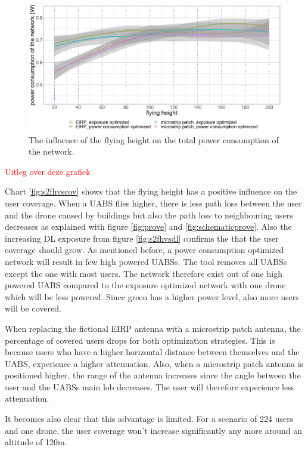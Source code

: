 \begin{figure}[h!]
  \includegraphics[width=\textwidth]{../results/s2/fhvspc.png}
  \caption{The influence of the flying height on the total power consumption of the network.}
  \label{fig:s2fhvspc}
\end{figure}
\textcolor{red}{Uitleg over deze grafiek}

Chart  \ref{fig:s2fhvscov} shows that the flying height has a positive influence on the user coverage. 
When a \gls{UABS} flies higher, there is less path loss between the user and the drone caused by buildings but also the path loss to neighbouring 
users decreases as explained 
with figure \ref{fig:prove} and \ref{fig:schematicprove}. 
Also the increasing \gls{DL} exposure  from figure \ref{fig:s2fhvsdl} confirms the that the
user coverage should grow.
As mentioned before, a power consumption optimized network will result in few high powered \gls{UABS}s. 
The tool removes all \gls{UABS}s except the one with most users. 
The network therefore exist out of one high powered \gls{UABS} compared to the exposure optimized network with one drone which 
will be less powered. Since green has a higher power level, also more users will be covered.

When replacing the fictional \gls{EIRP} antenna with a microstrip patch antenna, the percentage of covered users drops for both 
optimization strategies. This is because users who have a higher horizontal distance between themselves and the \gls{UABS}, 
experience a higher attenuation. Also, when a microstrip patch antenna is positioned higher, the range of the antenna increases 
since the angle between the user and the \gls{UABS}s main lob decreases. The user will therefore experience less attenuation.

It becomes also clear that this advantage is limited. For a scenario of 224 users and one drone, the user coverage won’t increase
 significantly any more around an altitude of 120m.

